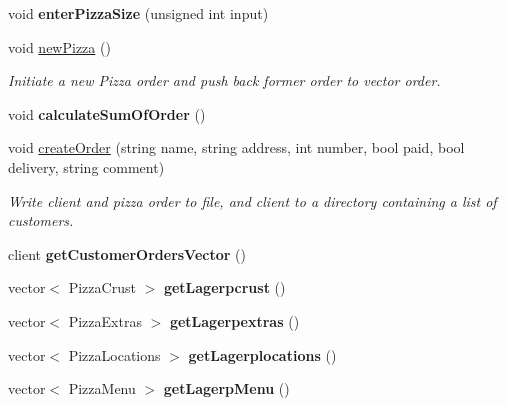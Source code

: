 \begin{CompactItemize}
\item 
\hypertarget{class_sala_caeeb8aada209ebb8bde4749b2ececdc}{
void {\bf enter\-Pizza\-Size} (unsigned int input)}
\label{class_sala_caeeb8aada209ebb8bde4749b2ececdc}

\item 
\hypertarget{class_sala_eadce54d849ca6634b7fdd389bd8f192}{
void \hyperlink{class_sala_eadce54d849ca6634b7fdd389bd8f192}{new\-Pizza} ()}
\label{class_sala_eadce54d849ca6634b7fdd389bd8f192}

\begin{CompactList}\small\item\em Initiate a new Pizza order and push back former order to vector order. \item\end{CompactList}\item 
\hypertarget{class_sala_24b9bb5302a251b41fed3df1fb7ce8ad}{
void {\bf calculate\-Sum\-Of\-Order} ()}
\label{class_sala_24b9bb5302a251b41fed3df1fb7ce8ad}

\item 
void \hyperlink{class_sala_554463c0b82fb266c21e23e040bf1ac0}{create\-Order} (string name, string address, int number, bool paid, bool delivery, string comment)
\begin{CompactList}\small\item\em Write client and pizza order to file, and client to a directory containing a list of customers. \item\end{CompactList}\item 
\hypertarget{class_sala_3a31e5a83058a950f863932d3ecaef2e}{
client {\bf get\-Customer\-Orders\-Vector} ()}
\label{class_sala_3a31e5a83058a950f863932d3ecaef2e}

\item 
\hypertarget{class_sala_85a631cad1f4009e87de7da3bc52174c}{
vector$<$ Pizza\-Crust $>$ {\bf get\-Lagerpcrust} ()}
\label{class_sala_85a631cad1f4009e87de7da3bc52174c}

\item 
\hypertarget{class_sala_49f231948b80188691882a8624a4612d}{
vector$<$ Pizza\-Extras $>$ {\bf get\-Lagerpextras} ()}
\label{class_sala_49f231948b80188691882a8624a4612d}

\item 
\hypertarget{class_sala_1e720a42845186f5057b36ab8b69711a}{
vector$<$ Pizza\-Locations $>$ {\bf get\-Lagerplocations} ()}
\label{class_sala_1e720a42845186f5057b36ab8b69711a}

\item 
\hypertarget{class_sala_89b38b3e2a9835524c9fd21628f485cc}{
vector$<$ Pizza\-Menu $>$ {\bf get\-Lagerp\-Menu} ()}
\label{class_sala_89b38b3e2a9835524c9fd21628f485cc}


\end{CompactItemize}
